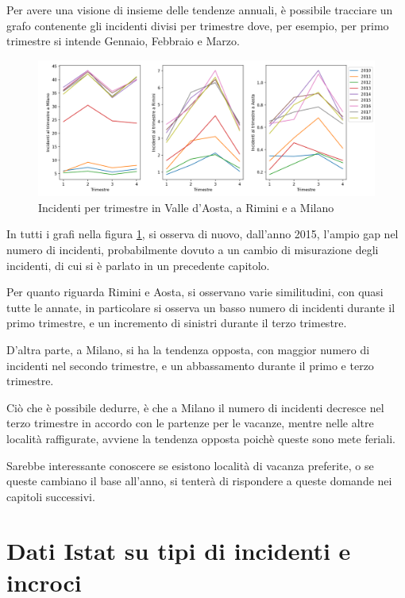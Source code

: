 \documentclass[a4paper]{report}
\begin{document}
Per avere una visione di insieme delle tendenze annuali, è possibile tracciare un grafo contenente 
gli incidenti divisi per trimestre dove, per esempio, per primo trimestre si intende Gennaio, 
Febbraio e Marzo.

\begin{figure}
    \includegraphics[width=\linewidth]{../src/incidenti/incidenti_senza_coords/mese_incidenti/trimestri_aosta_milano_rimini.png}
    \caption{Incidenti per trimestre in Valle d'Aosta, a Rimini e a Milano}
    \label{fig:aosta-rimini-milano-trimestre}
\end{figure}

In tutti i grafi nella figura \ref{fig:aosta-rimini-milano-trimestre}, si osserva di nuovo, 
dall'anno 2015, l'ampio gap nel numero di incidenti, probabilmente dovuto a un cambio di 
misurazione degli incidenti, di cui si è parlato in un precedente capitolo. 

Per quanto riguarda Rimini e Aosta, si osservano varie similitudini, con quasi tutte le annate, 
in particolare si osserva un basso numero di incidenti durante il primo trimestre, e un incremento di 
sinistri durante il terzo trimestre.

D'altra parte, a Milano, si ha la tendenza opposta, con maggior numero di incidenti nel secondo trimestre, 
e un abbassamento durante il primo e terzo trimestre.

Ciò che è possibile dedurre, è che a Milano il numero di incidenti decresce nel terzo trimestre in 
accordo con le partenze per le vacanze, mentre nelle altre località raffigurate, avviene la tendenza 
opposta poichè queste sono mete feriali.

Sarebbe interessante conoscere se esistono località di vacanza preferite, o se queste cambiano il base 
all'anno, si tenterà di rispondere a queste domande nei capitoli successivi.

\section{Dati Istat su tipi di incidenti e incroci}
\end{document}
